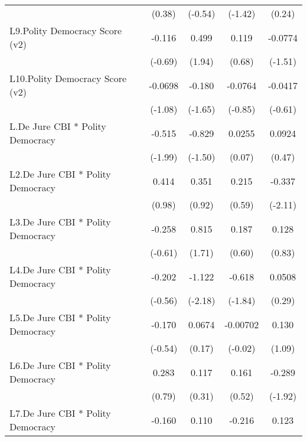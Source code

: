 {\begin{longtable}{l*{4}{c}}
                &   (0.38)         &  (-0.54)         &  (-1.42)         &   (0.24)         \\
[1em]
L9.Polity Democracy Score (v2)&   -0.116         &    0.499         &    0.119         &  -0.0774         \\
                &  (-0.69)         &   (1.94)         &   (0.68)         &  (-1.51)         \\
[1em]
L10.Polity Democracy Score (v2)&  -0.0698         &   -0.180         &  -0.0764         &  -0.0417         \\
                &  (-1.08)         &  (-1.65)         &  (-0.85)         &  (-0.61)         \\
[1em]
L.De Jure CBI * Polity Democracy&   -0.515\sym{*}  &   -0.829         &   0.0255         &   0.0924         \\
                &  (-1.99)         &  (-1.50)         &   (0.07)         &   (0.47)         \\
[1em]
L2.De Jure CBI * Polity Democracy&    0.414         &    0.351         &    0.215         &   -0.337\sym{*}  \\
                &   (0.98)         &   (0.92)         &   (0.59)         &  (-2.11)         \\
[1em]
L3.De Jure CBI * Polity Democracy&   -0.258         &    0.815         &    0.187         &    0.128         \\
                &  (-0.61)         &   (1.71)         &   (0.60)         &   (0.83)         \\
[1em]
L4.De Jure CBI * Polity Democracy&   -0.202         &   -1.122\sym{*}  &   -0.618         &   0.0508         \\
                &  (-0.56)         &  (-2.18)         &  (-1.84)         &   (0.29)         \\
[1em]
L5.De Jure CBI * Polity Democracy&   -0.170         &   0.0674         & -0.00702         &    0.130         \\
                &  (-0.54)         &   (0.17)         &  (-0.02)         &   (1.09)         \\
[1em]
L6.De Jure CBI * Polity Democracy&    0.283         &    0.117         &    0.161         &   -0.289         \\
                &   (0.79)         &   (0.31)         &   (0.52)         &  (-1.92)         \\
[1em]
L7.De Jure CBI * Polity Democracy&   -0.160         &    0.110         &   -0.216         &    0.123         \\

\end{longtable}}
